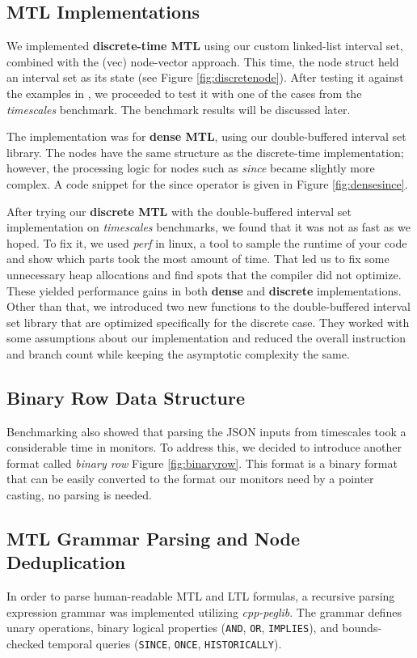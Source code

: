 \documentclass[a4paper,12pt]{report}
\begin{document}
\subsection{MTL Implementations} 
We implemented \textbf{discrete-time MTL} using our custom linked-list interval set, combined with the (vec) node-vector approach. This time, the node struct held an interval set as its state (see Figure \ref{fig:discretenode}). After testing it against the examples in \cite{Ulus19}, we proceeded to test it with one of the cases from the \textit{timescales} benchmark. The benchmark results will be discussed later.

The implementation was for \textbf{dense MTL}, using our double-buffered interval set library. The nodes have the same structure as the discrete-time implementation; however, the processing logic for nodes such as \textit{since} became slightly more complex. A code snippet for the since operator is given in Figure \ref{fig:densesince}.

After trying our \textbf{discrete MTL} with the double-buffered interval set implementation on \textit{timescales} benchmarks, we found that it was not as fast as we hoped. To fix it, we used \textit{perf} in linux, a tool to sample the runtime of your code and show which parts took the most amount of time. That led us to fix some unnecessary heap allocations and find spots that the compiler did not optimize. These yielded performance gains in both \textbf{dense} and  \textbf{discrete} implementations. Other than that, we introduced two new functions to the double-buffered interval set library that are optimized specifically for the discrete case. They worked with some assumptions about our implementation and reduced the overall instruction and branch count while keeping the asymptotic complexity the same.

\subsection{Binary Row Data Structure} 
Benchmarking also showed that parsing the JSON inputs from timescales took a considerable time in monitors. To address this, we decided to introduce another format called \textit{binary row} Figure \ref{fig:binaryrow}. This format is a binary format that can be easily converted to the format our monitors need by a pointer casting, no parsing is needed.

\subsection{MTL Grammar Parsing and Node Deduplication}
In order to parse human-readable MTL and LTL formulas, a recursive parsing expression grammar was implemented utilizing \textit{cpp-peglib}. The grammar defines unary operations, binary logical properties (\texttt{AND}, \texttt{OR}, \texttt{IMPLIES}), and bounds-checked temporal queries (\texttt{SINCE}, \texttt{ONCE}, \texttt{HISTORICALLY}).
\end{document}
